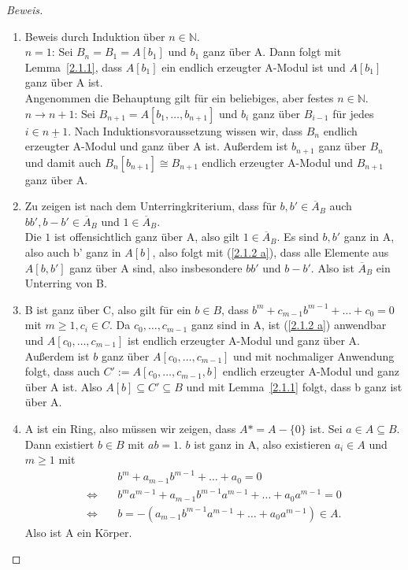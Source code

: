 \documentclass{article}
\begin{document}
	\begin{proof}[Beweis]
	\begin{enumerate}
	\item Beweis durch Induktion über \(n \in \mathbb{N}\).\\
	\(n = 1\): Sei \(B_n = B_1 = A[b_1]\) und \(b_1\) ganz über A. Dann folgt
	mit Lemma~\ref{2.1.1}, dass \(A[b_1]\) ein endlich erzeugter A-Modul ist
	und \(A[b_1]\) ganz über A ist. \\
	Angenommen die Behauptung gilt für ein beliebiges, aber festes \(n \in
	\mathbb{N}\). \\
	\(n \rightarrow n+1\): Sei \(B_{n+1} = A[b_1,\ldots,b_{n+1}]\) und \(b_i\) 
	ganz über \(B_{i-1}\) für jedes \(i \in \underline{n+1}\). Nach
	Induktionsvoraussetzung wissen wir, dass \(B_n\) endlich erzeugter A-Modul
	und ganz über A ist. Außerdem ist \(b_{n+1}\) ganz über \(B_n\) und damit
	auch \(B_n[b_{n+1}] \cong B_{n+1}\) endlich erzeugter A-Modul und \(B_{n+1}\)
	ganz über A.
	\item Zu zeigen ist nach dem Unterringkriterium, dass für \(b, b' \in 
	\overline{A}_B\) auch \(bb', b-b' \in \overline{A}_B\) und \(1 \in
	\overline{A}_B\). \\
	Die \(1\) ist offensichtlich ganz über A, also gilt \(1 \in \overline{A}_B\).
	Es sind \(b, b'\) ganz in A, also auch b' ganz in \(A[b]\), also folgt mit
	(\ref{2.1.2 a}), dass alle Elemente aus \(A[b,b']\) ganz über A sind, also
	insbesondere \(bb'\) und \(b-b'\). Also ist \(\overline{A}_B\) ein Unterring
	von B.
	\item B ist ganz über C, also gilt für ein \(b \in B\), dass
	\(b^m + c_{m-1}b^{m-1} + \ldots + c_0 = 0\) mit \(m \geq 1, c_i \in C\).
	Da \(c_0, \ldots, c_{m-1}\) ganz sind in A, ist (\ref{2.1.2 a}) anwendbar
	und \(A[c_0, \ldots, c_{m-1}]\) ist endlich erzeugter A-Modul und ganz über A.
	Außerdem ist \(b\) ganz über \(A[c_0, \ldots, c_{m-1}]\) und mit nochmaliger
	Anwendung folgt, dass auch \(C':=A[c_0, \ldots, c_{m-1}, b]\) endlich erzeugter
	A-Modul und ganz über A ist. Also \(A[b] \subseteq C' \subseteq B\) und
	mit Lemma~\ref{2.1.1} folgt, dass b ganz ist über A.
	\item A ist ein Ring, also müssen wir zeigen, dass \(A* = A-\{0\}\) ist.
	Sei \(a \in A \subseteq B\). Dann existiert \(b \in B\) mit \(ab = 1\).
	\(b\) ist ganz in A, also existieren \(a_i \in A\) und \(m \geq 1\) mit
	\begin{align*} &b^m + a_{m-1}b^{m-1} + \ldots + a_0 = 0 \\
	\Leftrightarrow\quad &b^ma^{m-1} + a_{m-1}b^{m-1}a^{m-1} + \ldots + a_0a^{m-1} = 0 \\
	\Leftrightarrow\quad &b = -(a_{m-1}b^{m-1}a^{m-1} + \ldots + a_0a^{m-1}) \in A.
	\end{align*}
	Also ist A ein Körper.
	\end{enumerate}
	\end{proof}
	
\end{document}
